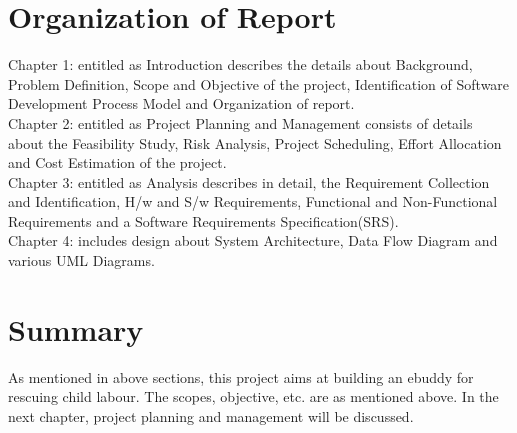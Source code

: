 \section{Organization of Report}
\hspace{1cm}Chapter 1: entitled as Introduction describes the details about Background, Problem     Definition, Scope and Objective of the project, Identification of Software Development Process Model and Organization of report. \\

\hspace{0.5cm}Chapter 2: entitled as Project Planning and Management consists of details about the Feasibility Study, Risk Analysis, Project Scheduling, Effort Allocation and Cost Estimation of the project. \\

\hspace{0.5cm}Chapter 3: entitled as Analysis describes in detail, the Requirement Collection and Identification, H/w and S/w Requirements, Functional and Non-Functional Requirements and a Software Requirements Specification(SRS). \\

\hspace{0.5cm}Chapter 4: includes design about System Architecture, Data Flow Diagram and various UML Diagrams. \\
 


\section{Summary}
As mentioned in above sections, this project aims at building an ebuddy for rescuing child labour. The scopes, objective, etc. are as mentioned above. In the next chapter, project planning and management will be discussed.